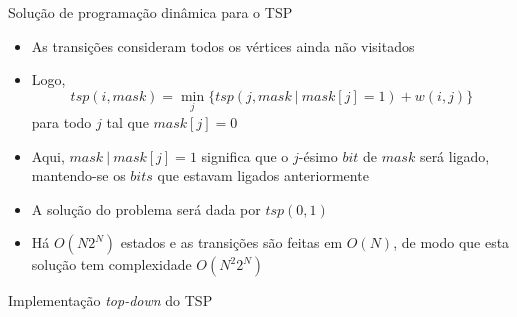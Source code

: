 \begin{frame}[fragile]{Solução de programação dinâmica para o TSP}

    \begin{itemize}
        \item As transições consideram todos os vértices ainda não visitados

        \item Logo, 
        \[
            tsp(i, mask) = \min_j \{ tsp(j, mask\ |\ mask[j] = 1) + w(i, j) \}
        \]
        para todo $j$ tal que $mask[j] = 0$

        \item Aqui, $mask\ |\ mask[j] = 1$ significa que o $j$-ésimo $bit$ de $mask$ será ligado, 
            mantendo-se os $bits$ que estavam ligados anteriormente

        \item A solução do problema será dada por $tsp(0, 1)$

        \item Há $O(N2^N)$ estados e as transições são feitas em $O(N)$, de modo que esta 
            solução tem complexidade $O(N^2 2^N)$
    \end{itemize}

\end{frame}

\begin{frame}[fragile]{Implementação {\it top-down} do TSP}
\end{frame}
